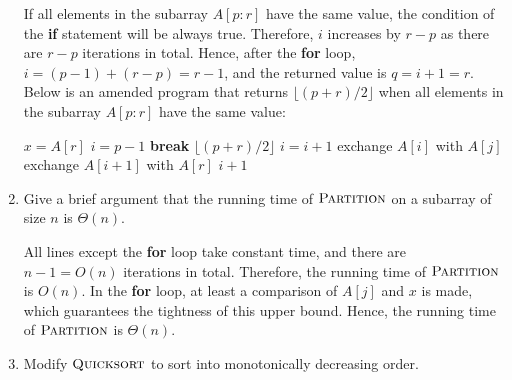 \documentclass[12pt,reqno]{amsart}
\newif\ifanswer
\begin{document}
\begin{enumerate}[1.]
\ifanswer
{}
If all elements in the subarray $A[p:r]$ have the same value, the condition of the \textbf{if} statement will be always true. Therefore, $i$ increases by $r - p$ as there are $r - p$ iterations in total. Hence, after the \textbf{for} loop, $i = (p - 1) + (r - p) = r - 1$, and the returned value is $q = i + 1 = r$. Below is an amended program that returns $\lfloor(p+r)/2\rfloor$ when all elements in the subarray $A[p:r]$ have the same value:
\begin{algorithm}
    \caption{$\textsc{Partition'}(A, p, r)$}
    \begin{algorithmic}[1]
        \STATE $x = A[r]$
        \STATE $i = p - 1$
                \STATE \textbf{break}
            \ENDIF
            \RETURN $\lfloor(p+r)/2\rfloor$
        \ENDFOR
                \STATE $i = i + 1$
                \STATE exchange $A[i]$ with $A[j]$
            \ENDIF
        \ENDFOR
        \STATE exchange $A[i + 1]$ with $A[r]$
        \RETURN $i + 1$
    \end{algorithmic}
\end{algorithm}
\vspace{1cm}



\item Give a brief argument that the running time of $\textsc{Partition}$ on a subarray of size $n$ is $\Theta(n)$.

\ifanswer
{}
All lines except the \textbf{for} loop take constant time, and there are $n - 1 = O(n)$ iterations in total. Therefore, the running time of $\textsc{Partition}$ is $O(n)$. In the \textbf{for} loop, at least a comparison of $A[j]$ and $x$ is made, which guarantees the tightness of this upper bound. Hence, the running time of $\textsc{Partition}$ is $\Theta(n)$.
\vspace{1cm}



\item Modify $\textsc{Quicksort}$ to sort into monotonically decreasing order.


\end{enumerate}
\end{document}
